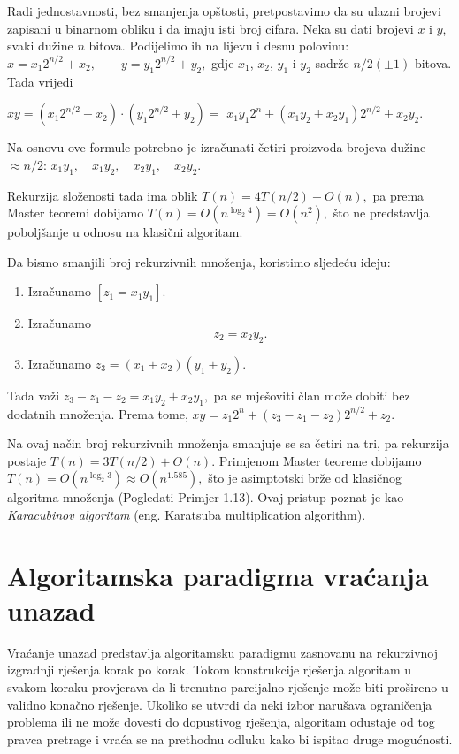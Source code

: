 \begin{solution}
	
	Radi jednostavnosti, bez smanjenja opštosti, pretpostavimo da su ulazni brojevi zapisani u binarnom obliku i da imaju isti broj cifara. Neka su dati brojevi $x$ i $y$, svaki dužine $n$ bitova. Podijelimo ih na lijevu i desnu polovinu: $
	x = x_1 2^{n/2} + x_2,
	\qquad
	y = y_1 2^{n/2} + y_2,
	$ gdje $x_1$, $x_2$, $y_1$ i $y_2$ sadrže $n/2 (\pm 1)$ bitova. 	Tada vrijedi
	
	$
	xy = (x_1 2^{n/2} + x_2)\cdot (y_1 2^{n/2} + y_2) =$ 
	$x_1y_1 2^n
	+
	(x_1y_2 + x_2y_1)2^{n/2}
	+
	x_2y_2.
	$
	
	Na osnovu ove formule potrebno je izračunati četiri proizvoda brojeva dužine $ \approx n/2$: $
	x_1y_1,\quad
	x_1y_2,\quad
	x_2y_1,\quad
	x_2y_2.
	$
	
	Rekurzija složenosti tada ima oblik $T(n)=4T(n/2)+O(n),$ pa prema Master teoremi dobijamo $T(n)=O(n^{\log_2 4})=O(n^2),$	što ne predstavlja poboljšanje u odnosu na klasični algoritam.
	
	Da bismo smanjili broj rekurzivnih množenja, koristimo sljedeću ideju:
	
	\begin{enumerate}
		\item Izračunamo $[
		z_1=x_1y_1]$.
		\item Izračunamo
		\[
		z_2=x_2y_2.
		\]
		\item Izračunamo $
		z_3=(x_1+x_2)(y_1+y_2).$
		
	\end{enumerate}
	
	Tada važi $z_3-z_1-z_2=
	x_1y_2+x_2y_1, $ 	pa se mješoviti član može dobiti bez dodatnih množenja. Prema tome, $xy=z_1 2^n	+	(z_3-z_1-z_2)2^{n/2} + z_2.$
	
	Na ovaj način broj rekurzivnih množenja smanjuje se sa četiri na tri, pa rekurzija postaje $T(n)=3T(n/2)+O(n).$ Primjenom Master teoreme dobijamo $T(n)=O(n^{\log_2 3})
	\approx O(n^{1.585}),$ što je asimptotski brže od klasičnog algoritma množenja (Pogledati Primjer 1.13). Ovaj pristup poznat je kao \textit{Karacubinov algoritam} (eng. {Karatsuba multiplication algorithm}).
\end{solution}

\section{Algoritamska paradigma vraćanja unazad}

{Vraćanje unazad} predstavlja algoritamsku paradigmu zasnovanu na rekurzivnoj izgradnji rješenja korak po korak. Tokom konstrukcije rješenja algoritam u svakom koraku provjerava da li trenutno parcijalno rješenje može biti prošireno u validno konačno rješenje. Ukoliko se utvrdi da neki izbor narušava ograničenja problema ili ne može dovesti do dopustivog rješenja, algoritam odustaje od tog pravca pretrage i vraća se na prethodnu odluku kako bi ispitao druge mogućnosti.

